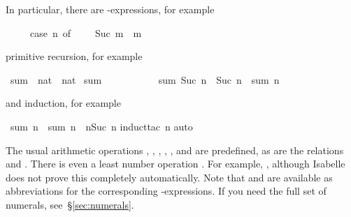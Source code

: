 %
\begin{isabellebody}%
\def\isabellecontext{natsum}%
%
\begin{isamarkuptext}%
\noindent
In particular, there are -expressions, for example
\begin{isabelle}%
\ \ \ \ \ case\ n\ of\ {}\ {\isasymRightarrow}\ {}\ {\isacharbar}\ Suc\ m\ {\isasymRightarrow}\ m%
\end{isabelle}
primitive recursion, for example%
\end{isamarkuptext}%
\ sum\ {\isacharcolon}{\isacharcolon}\ {\isachardoublequote}nat\ {\isasymRightarrow}\ nat{\isachardoublequote}\isanewline
{}\ {\isachardoublequote}sum\ {}\ {\isacharequal}\ {}{\isachardoublequote}\isanewline
\ \ \ \ \ \ \ \ {\isachardoublequote}sum\ {\isacharparenleft}Suc\ n{\isacharparenright}\ {\isacharequal}\ Suc\ n\ {\isacharplus}\ sum\ n{\isachardoublequote}%
\begin{isamarkuptext}%
\noindent
and induction, for example%
\end{isamarkuptext}%
\ {\isachardoublequote}sum\ n\ {\isacharplus}\ sum\ n\ {\isacharequal}\ n{\isacharasterisk}{\isacharparenleft}Suc\ n{\isacharparenright}{\isachardoublequote}\isanewline
{}induct{\isacharunderscore}tac\ n{\isacharparenright}\isanewline
{}auto{\isacharparenright}\isanewline
{}%
\begin{isamarkuptext}%
\newcommand{\mystar}{*%
}
The usual arithmetic operations ,
, \ttindexboldpos{\mystar}{$HOL2arithfun},
, ,  and
 are predefined, as are the relations
 and
. There is even a least number operation
. For example, , although
Isabelle does not prove this completely automatically. Note that 
and  are available as abbreviations for the corresponding
-expressions. If you need the full set of numerals,
see~\S\ref{sec:numerals}.


\end{isamarkuptext}
\end{isabellebody}
